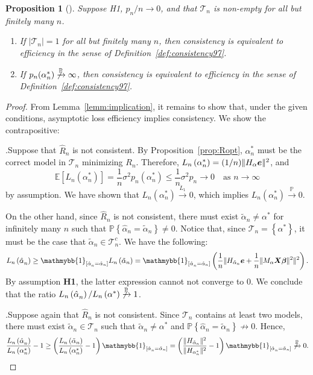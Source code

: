\documentclass[12pt, letter paper]{article}
\newcommand{\1}{\mathmybb{1}}
\newtheorem{proposition}{Proposition}[section]
\newcommand{\0}{\emptyset}
\newcommand{\prob}{\mathbb{P}}
\newcommand{\Ep}[1]{\mathbb{E}\left[ #1 \right]}
\newcommand{\paren}[1]{\left(#1 \right)}
\newcommand{\sqbr}[1]{\left[#1 \right]}
\newcommand{\set}[1]{\left\{ #1 \right\}}
\newcommand{\norm}[1]{|\hspace{-1pt}|#1 |\hspace{-1pt}|}
\newcommand{\normsq}[1]{\norm{#1}^{2}}
\newcommand{\ind}[1]{\mathmybb{1}_{\sqbr{#1}}}
\newcommand{\Tcal}{\mathcal{T}_{n}}
\newcommand{\X}{\boldsymbol{X}}
\newcommand{\e}{\boldsymbol{e}}
\newcommand{\bbeta}{\boldsymbol{\beta}}
\newcommand{\Loss}[1]{L_{n}\paren{#1}}
\newcommand{\alphahat}[1]{\hat{\alpha}^{#1}}
\newcommand{\alphatilde}{\tilde{\alpha}}
\begin{document}
\begin{proposition}[\cite{shao_1997}]\label{prop:equiv}
    Suppose H1, \(p_{n}/n\to 0\), and that \(\Tcal\) is non-empty for all but finitely many \(n\).
    \begin{enumerate}
        \item If \(|\Tcal|=1\) for all but finitely many \(n\), then consistency is equivalent to efficiency in the sense of Definition~\ref{def:consistency97}.
        \item If \(p_{n}(\alpha^{*}_{n})\not\xrightarrow{\prob}\infty\), then consistency is equivalent to efficiency in the sense of Definition~\ref{def:consistency97}.
    \end{enumerate}
\end{proposition}
\begin{proof}
    From Lemma~\ref{lemm:implication}, it remains to show that, under the given conditions, asymptotic loss efficiency implies consistency. We show the contrapositive:

    .\quad Suppose that \(\hat{R}_{n}\) is not consistent. By Proposition~\ref{prop:Ropt}, \(\alpha^{*}_{n}\) must be the correct model in \(\Tcal\) minimizing \(R_{n}\). Therefore, \(\Loss{\alpha^{*}_{n}} = (1/n)\normsq{H_{\alpha}\e}\), and
    \[\Ep{\Loss{\alpha^{*}_{n}}} = \frac{1}{n}\sigma^{2}p_{n}(\alpha^{*}_{n})\leq \frac{1}{n}\sigma^{2}p_{n}\to 0 \quad\text{as }n\to\infty\]
    by assumption. We have shown that \(\Loss{\alpha^{*}_{n}}\xrightarrow{L_{1}} 0\), which implies \(\Loss{\alpha^{*}_{n}}\xrightarrow{\prob} 0\).

    On the other hand, since \(\hat{R}_{n}\) is not consistent, there must exist \(\alphatilde_{n}\neq\alpha^{*}\) for infinitely many \(n\) such that \(\prob\set{\alphahat{}_{n} = \alphatilde_{n}} \neq 0\). Notice that, since \(\Tcal=\set{\alpha^{*}}\), it must be the case that \(\alphatilde_{n}\in\Tcal^{c}\). We have the following:
    \[\Loss{\alphahat{}_{n}}\geq \ind{\alphahat{}_{n} = \alphatilde_{n}}\Loss{\alphatilde_{n}} = \ind{\alphahat{}_{n} = \alphatilde_{n}}\paren{\frac{1}{n}\normsq{H_{\alphatilde_{n}}\e + \frac{1}{n}\normsq{M_{\alpha}\X\bbeta}}}.\]
    By assumption \textbf{H1}, the latter expression cannot not converge to 0. We conclude that the ratio \(\Loss{\alphahat{}_{n}}/\Loss{\alpha^{*}}\not\xrightarrow{\prob} 1\).

    .\quad Suppose again that \(\hat{R}_{n}\) is not consistent. Since \(\Tcal\) contains at least two models, there must exist \(\alphatilde_{n}\in\Tcal\) such that \(\alphatilde_{n}\neq \alpha^{*}\) and \(\prob\set{\alphahat{}_{n} = \alphatilde_{n}}\not\to 0\). Hence,
    \[\frac{\Loss{\alphahat{}_{n}}}{\Loss{\alpha^{*}_{n}}} - 1 \geq \paren{\frac{\Loss{\alphatilde{}_{n}}}{\Loss{\alpha^{*}_{n}}} - 1}\ind{\alphahat{}_{n} = \alphatilde_{n}} = \paren{\frac{\normsq{H_{\alphatilde_{n}}}}{\normsq{H_{\alpha^{*}_{n}}}} - 1}\ind{\alphahat{}_{n} = \alphatilde_{n}}\not\xrightarrow{\prob}0.\]
\end{proof}
\end{document}
